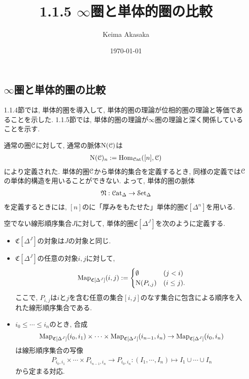 \documentclass[uplatex, a4paper, 14Q, dvipdfmx]{jsreport}
\title{1.1.5 \texorpdfstring{$\infty$}{infty}圏と単体的圏の比較}
\author{Keima Akasaka}
\date{\today}
\begin{document}

\setcounter{chapter}{1}
\setcounter{section}{1} 
\setcounter{subsection}{4}   
\setcounter{subsubsection}{1}

\subsection{\texorpdfstring{$\infty$}{infty}圏と単体的圏の比較}

1.1.4節では, 単体的圏を導入して, 単体的圏の理論が位相的圏の理論と等価であることを示した.
1.1.5節では, 単体的圏の理論が$\infty$圏の理論と深く関係していることを示す. 

通常の圏$\mathcal{C}$に対して, 通常の脈体$\mathrm{N}(\mathcal{C})$は
\begin{align*}
  \mathrm{N}(\mathcal{C})_n := \mathrm{Hom}_{\mathcal{C}\mathrm{at}}([n],\mathcal{C})
\end{align*}
により定義された. 
単体的圏$\mathcal{C}$から単体的集合を定義するとき, 同様の定義では$\mathcal{C}$の単体的構造を用いることができない. 
よって, 単体的圏の脈体
\begin{align*}
  \mathfrak{N} : \mathcal{C}\mathrm{at}_{\Delta} \to \mathcal{S}\mathrm{et}_{\Delta}
\end{align*}
を定義するときには, $[n]$のに「厚みをもたせた」単体的圏$\mathfrak{C}[\Delta^n]$を用いる. 

\begin{definition} \label{def.1.1.5.1}
  空でない線形順序集合$J$に対して, 単体的圏$\mathfrak{C}[\Delta^J]$を次のように定義する. 
  \begin{itemize}
    \item $\mathfrak{C}[\Delta^J]$の対象は$J$の対象と同じ.
    \item $\mathfrak{C}[\Delta^J]$の任意の対象$i,j$に対して, 
    \begin{align*}
      \mathrm{Map}_{\mathfrak{C}[\Delta^J]}(i,j)
      := \begin{cases}
        \emptyset & (j < i) \\
        \mathrm{N}(P_{i,j}) & (i \leq j).
      \end{cases}
    \end{align*}
    ここで, $P_{i,j}$は$i$と$j$を含む任意の集合$[i,j]$のなす集合に包含による順序を入れた線形順序集合である. 
    \item $i_0 \leq \cdots \leq i_n$のとき, 合成 
    \begin{align*}
      \mathrm{Map}_{\mathfrak{C}[\Delta^J]}(i_0,i_1) \times \cdots \times \mathrm{Map}_{\mathfrak{C}[\Delta^J]}(i_{n-1},i_n) \to \mathrm{Map}_{\mathfrak{C}[\Delta^J]}(i_0,i_n)
    \end{align*}
    は線形順序集合の写像
    \begin{align*}
      P_{i_0,i_1} \times \cdots \times P_{i_{n-1},i_n} \to P_{i_0,i_n} : (I_1, \cdots, I_n) \mapsto I_1 \cup \cdots \cup I_n
    \end{align*}
    から定まる対応.
  \end{itemize}
\end{definition}
\end{document}
